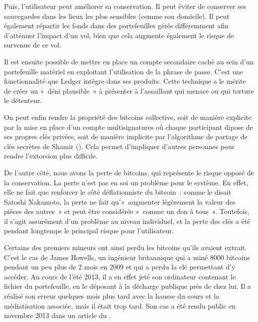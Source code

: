 Puis, l'utilisateur peut améliorer sa conservation. Il peut éviter de conserver ses sauvegardes dans les lieux les plus sensibles (comme son domicile). Il peut également répartir les fonds dans des portefeuilles gérés différemment afin d'atténuer l'impact d'un vol, bien que cela augmente également le risque de survenue de ce vol.

Il est ensuite possible de mettre en place un compte secondaire caché au sein d'un portefeuille matériel en exploitant l'utilisation de la phrase de passe. C'est une fonctionnalité que Ledger intègre dans ses produits. Cette technique a le mérite de créer un «~déni plausible~» à présenter à l'assaillant qui menace ou qui torture le détenteur.

On peut enfin rendre la propriété des bitcoins collective, soit de manière explicite par la mise en place d'un compte multisignatures où chaque participant dipose de ses propres clés privées, soit de manière implicite par l'algorithme de partage de clés secrètes de Shamir (). Cela permet d'impliquer d'autres personnes pour rendre l'extorsion plus difficile. 

De l'autre côté, nous avons la perte de bitcoins, qui représente le risque opposé de la conservation. La perte n'est pas en soi un problème pour le système. En effet, elle ne fait que renforcer le côté déflationniste du bitcoin~: comme le disait Satoshi Nakamoto, la perte ne fait qu'«~augmenter légèrement la valeur des pièces des autres~» et peut être considérée «~comme un don à tous~». Toutefois, il s'agit assurément d'un problème au niveau individuel, et la perte des clés a été pendant longtemps le principal risque pour l'utilisateur.

Certains des premiers mineurs ont ainsi perdu les bitcoins qu'ils avaient extrait. C'est le cas de James Howells, un ingénieur britannique qui a miné 8000 bitcoins pendant un peu plus de 2 mois en 2009 et qui a perdu la clé permettant d'y accéder. Au cours de l’été 2013, il a en effet jeté son ordinateur contenant le fichier du portefeuille, en le déposant à la décharge publique près de chez lui. Il a réalisé son erreur quelques mois plus tard avec la hausse du cours et la médiatisation associée, mais il était trop tard. Son cas a été rendu public en novembre 2013 dans un article du .

